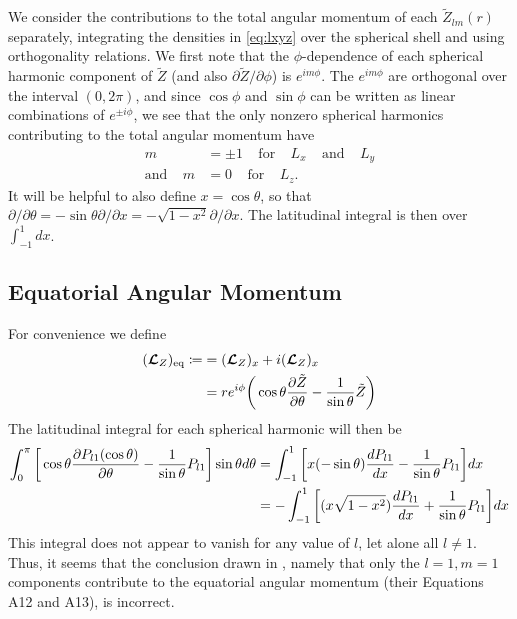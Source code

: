 \documentclass[12pt]{article} %
\newcommand{\pderiv}[2]{\frac{\partial#1}{\partial#2}}
\newcommand{\andd}{\text{and}\ \ \ \ \ }
\newcommand{\tz}{\tilde{Z}}
\newcommand{\five}{\ \ \ \ \ }
\begin{document}
We consider the contributions to the total angular momentum of each $\tz_{lm}(r)$ separately, integrating the densities in \eqref{eq:lxyz} over the spherical shell and using orthogonality relations. We first note that the $\phi$-dependence of each spherical harmonic component of $\tz$ (and also $\partial\tz/\partial\phi$) is $e^{im\phi}$. The $e^{im\phi}$ are orthogonal over the interval $(0,2\pi)$, and since $\cos\phi$ and $\sin\phi$ can be written as linear combinations of $e^{\pm i\phi}$, we see that the only nonzero spherical harmonics contributing to the total angular momentum have 
\begin{align}
m&=\pm 1 \five\text{for}\five L_x\five\andd L_y\\
\andd m&=0 \five\text{for}\five L_z. 
\end{align}
It will be helpful to also define $x=\cos\theta$, so that $\partial/\partial\theta = -\sin\theta\partial/\partial x = -\sqrt{1-x^2}\partial/\partial x$. The latitudinal integral is then over $\int_{-1}^1 dx$.
\subsection{Equatorial Angular Momentum}
For convenience we define 
\begin{align}
(\bm{\mathcal{L}}_Z)_{\rm{eq}} \coloneqq &= (\bm{\mathcal{L}}_Z)_x + i(\bm{\mathcal{L}}_Z)_x\nonumber\\
	&= re^{i\phi}\bigg{(}\cos\theta\pderiv{\tz}{\theta} - \frac{1}{\sin\theta}\tz\bigg{)}
\end{align}
The latitudinal integral for each spherical harmonic will then be
\begin{align*}
\int_0^\pi \bigg{[} \cos\theta\pderiv{P_{l1}(\cos\theta)}{\theta} - \frac{1}{\sin\theta}P_{l1}\bigg{]}\sin\theta d\theta&= \int_{-1}^1 \bigg{[}x (-\sin\theta)\frac{dP_{l1}}{dx} - \frac{1}{\sin\theta}P_{l1}\bigg{]}dx\\
&= -\int_{-1}^1\bigg{[}(x\sqrt{1-x^2})\frac{dP_{l1}}{dx}  +  \frac{1}{\sin\theta}P_{l1}\bigg{]}dx
\end{align*}
This integral does not appear to vanish for any value of $l$, let alone all $l\neq 1$. Thus, it seems that the conclusion drawn in \citet{Jones2011}, namely that only the $l=1, m=1$ components contribute to the equatorial angular momentum (their Equations A12 and A13), is incorrect.
\end{document}
